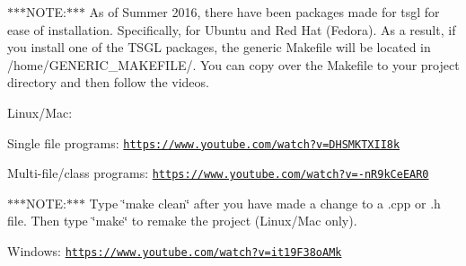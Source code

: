 $\ast$$\ast$$\ast$\-N\-O\-T\-E\-:$\ast$$\ast$$\ast$ As of Summer 2016, there have been packages made for tsgl for ease of installation. Specifically, for Ubuntu and Red Hat (Fedora). As a result, if you install one of the T\-S\-G\-L packages, the generic Makefile will be located in /home/\-G\-E\-N\-E\-R\-I\-C\-\_\-\-M\-A\-K\-E\-F\-I\-L\-E/. You can copy over the Makefile to your project directory and then follow the videos.

Linux/\-Mac\-:


\begin{DoxyItemize}
\item Single file programs\-: \href{https://www.youtube.com/watch?v=DHSMKTXII8k}{\tt https\-://www.\-youtube.\-com/watch?v=\-D\-H\-S\-M\-K\-T\-X\-I\-I8k}
\item Multi-\/file/class programs\-: \href{https://www.youtube.com/watch?v=-nR9kCeEAR0}{\tt https\-://www.\-youtube.\-com/watch?v=-\/n\-R9k\-Ce\-E\-A\-R0}
\end{DoxyItemize}

$\ast$$\ast$$\ast$\-N\-O\-T\-E\-:$\ast$$\ast$$\ast$ Type \char`\"{}make clean\char`\"{} after you have made a change to a .cpp or .h file. Then type \char`\"{}make\char`\"{} to remake the project (Linux/\-Mac only).

Windows\-: \href{https://www.youtube.com/watch?v=it19F38oAMk}{\tt https\-://www.\-youtube.\-com/watch?v=it19\-F38o\-A\-Mk} 
